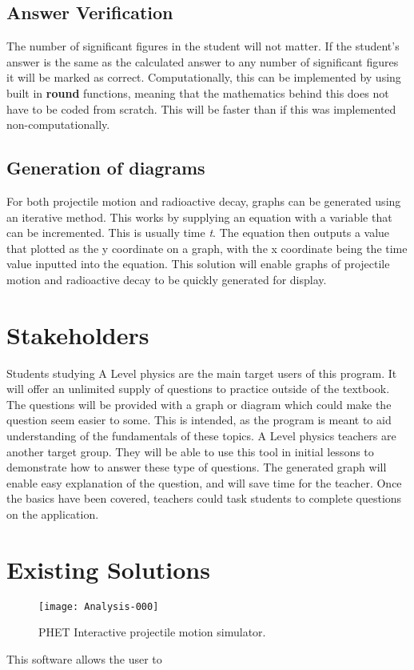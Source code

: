 \subsection{Answer Verification}
The number of significant figures in the student will not matter. If the student's answer is the same as the calculated answer to any number of significant figures it will be marked as correct. Computationally, this can be implemented by using built in \textbf{round} functions, meaning that the mathematics behind this does not have to be coded from scratch. This will be faster than if this was implemented non-computationally.
\subsection{Generation of diagrams}
For both projectile motion and radioactive decay, graphs can be generated using an iterative method. This works by supplying an equation with a variable that can be incremented. This is usually time \textit{t}. The equation then outputs a value that plotted as the y coordinate on a graph, with the x coordinate being the time value inputted into the equation. This solution will enable graphs of projectile motion and radioactive decay to be quickly generated for display.
\section{Stakeholders}
Students studying A Level physics are the main target users of this program. It will offer an unlimited supply of questions to practice outside of the textbook. The questions will be provided with a graph or diagram which could make the question seem easier to some. This is intended, as the program is meant to aid understanding of the fundamentals of these topics. 
A Level physics teachers are another target group. They will be able to use this tool in initial lessons to demonstrate how to answer these type of questions. The generated graph will enable easy explanation of the question, and will save time for the teacher. Once the basics have been covered, teachers could task students to complete questions on the application.
\clearpage
\section{Existing Solutions}
\begin{figure}[h]
	\centering
	\texttt{[image: Analysis-000]}
	\caption[PHET Interactive projectile motion simulator.]{PHET Interactive projectile motion simulator. \autocite{phet}}
\end{figure}
This software allows the user to

	